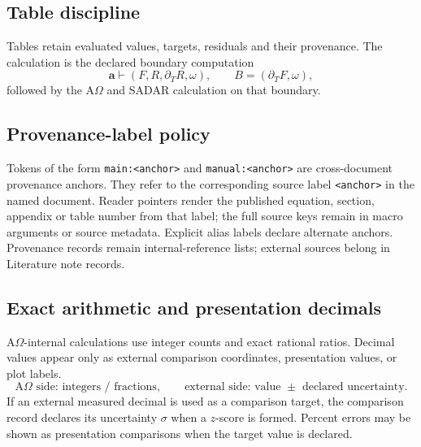 \subsection{Table discipline}\label{manual:table-discipline}
Tables retain evaluated values, targets, residuals and their provenance. The calculation is the declared boundary computation
\[
\mathbf a\vdash(F,R,\partial_T R,\omega),
\qquad
B=(\partial_TF,\omega),
\]
followed by the A\(\Omega\) and SADAR calculation on that boundary.


\subsection{Provenance-label policy}\label{manual:provenance-label-policy}
Tokens of the form \texttt{main:<anchor>} and \texttt{manual:<anchor>} are cross-document provenance anchors. They refer to the corresponding source label \texttt{<anchor>} in the named document. Reader pointers render the published equation, section, appendix or table number from that label; the full source keys remain in macro arguments or source metadata. Explicit alias labels declare alternate anchors. Provenance records remain internal-reference lists; external sources belong in Literature note records.

\subsection{Exact arithmetic and presentation decimals}\label{manual:exact-arithmetic-presentation}
A\(\Omega\)-internal calculations use integer counts and exact rational ratios. Decimal values appear only as external comparison coordinates, presentation values, or plot labels.
\[
\text{A\(\Omega\) side: integers / fractions},
\qquad
\text{external side: value }\pm\text{ declared uncertainty}.
\]
If an external measured decimal is used as a comparison target, the comparison record declares its uncertainty \(\sigma\) when a \(z\)-score is formed. Percent errors may be shown as presentation comparisons when the target value is declared.

